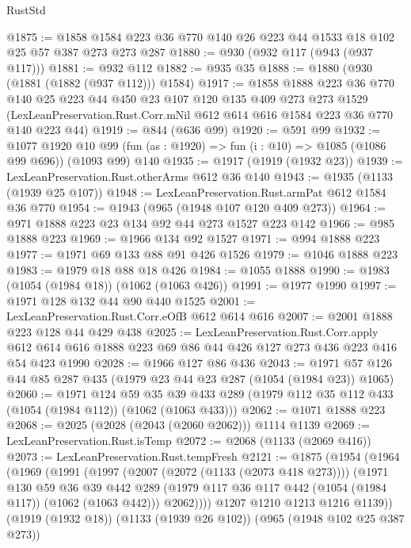 \begin{lexlean}{RustStd}
\begin{coremodule}
@1875 := @1858 @1584 @223 @36 @770 @140 @26 @223 @44 @1533 @18 @102 @25 @57 @387 @273 @273 @287
@1880 := @930 (@932 @117 (@943 (@937 @117)))
@1881 := @932 @112
@1882 := @935 @35
@1888 := @1880 (@930 (@1881 (@1882 (@937 @112))) @1584)
@1917 := @1858
    @1888
    @223
    @36
    @770
    @140
    @25
    @223
    @44
    @450
    @23
    @107
    @120
    @135
    @409
    @273
    @273
    @1529
    (LexLeanPreservation.Rust.Corr.mNil @612 @614 @616 @1584 @223 @36 @770 @140 @223 @44)
@1919 := @844 (@636 @99)
@1920 := @591 @99
@1932 := @1077
    @1920
    @10
    @99
    (fun (as : @1920) => fun (i : @10) => @1085 (@1086 @99 @696))
    (@1093 @99)
    @140
@1935 := @1917 (@1919 (@1932 @23))
@1939 := LexLeanPreservation.Rust.otherArms @612 @36 @140
@1943 := @1935 (@1133 (@1939 @25 @107))
@1948 := LexLeanPreservation.Rust.armPat @612 @1584 @36 @770
@1954 := @1943 (@965 (@1948 @107 @120 @409 @273))
@1964 := @971 @1888 @223 @23 @134 @92 @44 @273 @1527 @223 @142
@1966 := @985 @1888 @223
@1969 := @1966 @134 @92 @1527
@1971 := @994 @1888 @223
@1977 := @1971 @69 @133 @88 @91 @426 @1526
@1979 := @1046 @1888 @223
@1983 := @1979 @18 @88 @18 @426
@1984 := @1055 @1888
@1990 := @1983 (@1054 (@1984 @18)) (@1062 (@1063 @426))
@1991 := @1977 @1990
@1997 := @1971 @128 @132 @44 @90 @440 @1525
@2001 := LexLeanPreservation.Rust.Corr.eOfB @612 @614 @616
@2007 := @2001 @1888 @223 @128 @44 @429 @438
@2025 := LexLeanPreservation.Rust.Corr.apply
    @612
    @614
    @616
    @1888
    @223
    @69
    @86
    @44
    @426
    @127
    @273
    @436
    @223
    @416
    @54
    @423
    @1990
@2028 := @1966 @127 @86 @436
@2043 := @1971 @57 @126 @44 @85 @287 @435 (@1979 @23 @44 @23 @287 (@1054 (@1984 @23)) @1065)
@2060 := @1971
    @124
    @59
    @35
    @39
    @433
    @289
    (@1979 @112 @35 @112 @433 (@1054 (@1984 @112)) (@1062 (@1063 @433)))
@2062 := @1071 @1888 @223
@2068 := @2025 (@2028 (@2043 (@2060 @2062))) @1114 @1139
@2069 := LexLeanPreservation.Rust.isTemp
@2072 := @2068 (@1133 (@2069 @416))
@2073 := LexLeanPreservation.Rust.tempFresh
@2121 := @1875
    (@1954
      (@1964
        (@1969
          (@1991
            (@1997
              (@2007 (@2072 (@1133 (@2073 @418 @273))))
              (@1971
                @130
                @59
                @36
                @39
                @442
                @289
                (@1979 @117 @36 @117 @442 (@1054 (@1984 @117)) (@1062 (@1063 @442)))
                @2062))))
        @1207
        @1210
        @1213
        @1216
        @1139))
    (@1919 (@1932 @18))
    (@1133 (@1939 @26 @102))
    (@965 (@1948 @102 @25 @387 @273))

\end{coremodule}
\end{lexlean}
